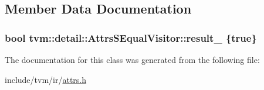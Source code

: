 \subsection{Member Data Documentation}
\subsubsection[{\texorpdfstring{result\+\_\+}{result_}}]{\setlength{\rightskip}{0pt plus 5cm}bool tvm\+::detail\+::\+Attrs\+S\+Equal\+Visitor\+::result\+\_\+ \{true\}}\hypertarget{classtvm_1_1detail_1_1AttrsSEqualVisitor_aeda3a91f0b2d1a7a9a075828954ff77f}{}\label{classtvm_1_1detail_1_1AttrsSEqualVisitor_aeda3a91f0b2d1a7a9a075828954ff77f}


The documentation for this class was generated from the following file\+:\begin{DoxyCompactItemize}
\item 
include/tvm/ir/\hyperlink{ir_2attrs_8h}{attrs.\+h}\end{DoxyCompactItemize}
